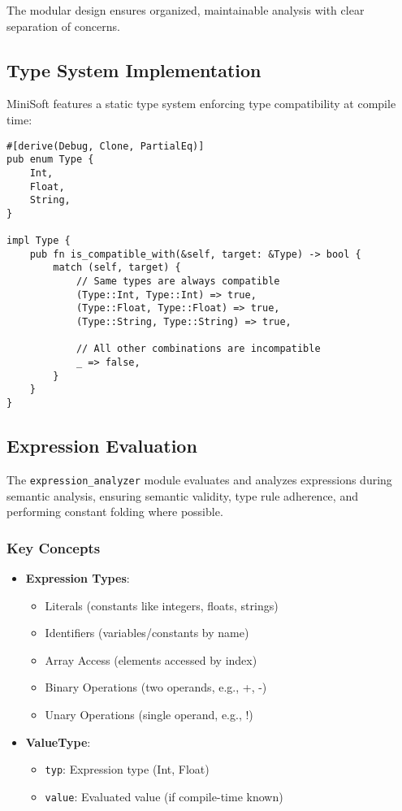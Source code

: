 \documentclass[12pt,a4paper]{article}
\begin{document}
The modular design ensures organized, maintainable analysis with clear separation of concerns.

\subsection{Type System Implementation}
MiniSoft features a static type system enforcing type compatibility at compile time:

\begin{lstlisting}[caption={Type System}]
#[derive(Debug, Clone, PartialEq)]
pub enum Type {
    Int,
    Float,
    String,
}

impl Type {
    pub fn is_compatible_with(&self, target: &Type) -> bool {
        match (self, target) {
            // Same types are always compatible
            (Type::Int, Type::Int) => true,
            (Type::Float, Type::Float) => true,
            (Type::String, Type::String) => true,
            
            // All other combinations are incompatible
            _ => false,
        }
    }
}
\end{lstlisting}

\subsection{Expression Evaluation}
The \texttt{expression\_analyzer} module evaluates and analyzes expressions during semantic analysis, ensuring semantic validity, type rule adherence, and performing constant folding where possible.

\subsubsection*{Key Concepts}
\begin{itemize}
    \item \textbf{Expression Types}:
    \begin{itemize}
        \item Literals (constants like integers, floats, strings)
        \item Identifiers (variables/constants by name)
        \item Array Access (elements accessed by index)
        \item Binary Operations (two operands, e.g., +, -)
        \item Unary Operations (single operand, e.g., !)
    \end{itemize}
    
    \item \textbf{ValueType}:
    \begin{itemize}
        \item \texttt{typ}: Expression type (Int, Float)
        \item \texttt{value}: Evaluated value (if compile-time known)
    \end{itemize}
\end{itemize}
\end{document}
